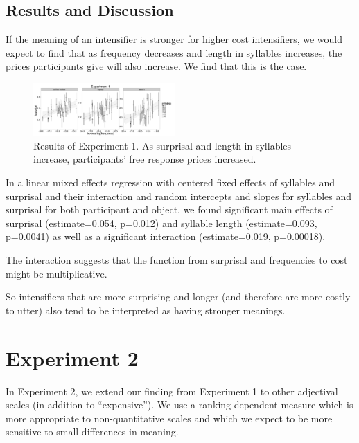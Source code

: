 \documentclass[10pt,letterpaper]{article}
\begin{document}
\subsection{Results and Discussion}

If the meaning of an intensifier is stronger for higher cost intensifiers, we would expect to find that as frequency decreases and length in syllables increases, the prices participants give will also increase. We find that this is the case.

\begin{figure}[ht]
\begin{center}
\includegraphics[width=0.48\textwidth]{analysis_files_for_writeup/images/exp1-plot.png}
\end{center}
\caption{Results of Experiment 1. As surprisal and length in syllables increase, participants' free response prices increased.} 
\label{exp1-plot}
\end{figure}

In a linear mixed effects regression with centered fixed effects of syllables and surprisal and their interaction and random intercepts and slopes for syllables and surprisal for both participant and object, we found significant main effects of surprisal (estimate=0.054, p=0.012) and syllable length  (estimate=0.093, p=0.0041) as well as a significant interaction (estimate=0.019, p=0.00018).

The interaction suggests that the function from surprisal and frequencies to cost might be multiplicative.

So intensifiers that are more surprising and longer (and therefore are more costly to utter) also tend to be interpreted as having stronger meanings.


\section{Experiment 2}

In Experiment 2, we extend our finding from Experiment 1 to other adjectival scales (in addition to ``expensive''). We use a ranking dependent measure which is more appropriate to non-quantitative scales and which we expect to be more sensitive to small differences in meaning.
\end{document}
